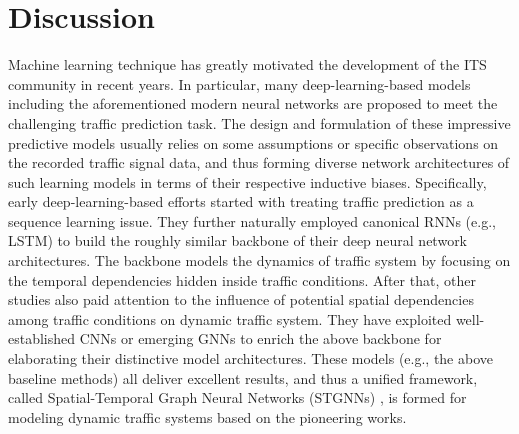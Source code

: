 \section{Discussion}
Machine learning technique has greatly motivated the development of the ITS community in recent years. In particular, many deep-learning-based models including the aforementioned modern neural networks are proposed to meet the challenging traffic prediction task. The design and formulation of these impressive predictive models usually relies on some assumptions or specific observations on the recorded traffic signal data, and thus forming diverse network architectures of such learning models in terms of their respective inductive biases. Specifically, early deep-learning-based efforts started with treating traffic prediction as a sequence learning issue. They further naturally employed canonical RNNs (e.g., LSTM) to build the roughly similar backbone of their deep neural network architectures. The backbone models the dynamics of traffic system by focusing on the temporal dependencies hidden inside traffic conditions. After that, other studies also paid attention to the influence of potential spatial dependencies among traffic conditions on dynamic traffic system. They have exploited well-established CNNs or emerging GNNs to enrich the above backbone for elaborating their distinctive model architectures. These models (e.g., the above baseline methods) all deliver excellent results, and thus a unified framework, called Spatial-Temporal Graph Neural Networks (STGNNs) \cite{2019A}, is formed for modeling dynamic traffic systems based on the pioneering works.

